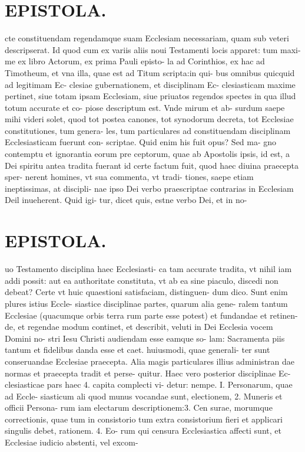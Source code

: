\documentclass{article}
\begin{document}
\begin{pages}
\section*{EPISTOLA. }\pstart cte constituendam regendamque suam Ecclesiam necessariam, quam sub veteri descripserat. Id quod cum ex variis aliis noui Testamenti locis apparet: tum maxi- me ex libro Actorum, ex prima Pauli episto- la ad Corinthios, ex hac ad Timotheum, et vna illa, quae est ad Titum scripta:in qui- bus omnibus quicquid ad legitimam Ec- clesiae gubernationem, et disciplinam Ec- clesiasticam maxime pertinet, siue totam ipsam Ecclesiam, siue priuatos regendos spectes in qua illud totum accurate et co- piose descriptum est. Vnde mirum et ab- surdum saepe mihi videri solet, quod tot postea canones, tot synodorum decreta, tot Ecclesiae constitutiones, tum genera- les, tum particulares ad constituendam disciplinam Ecclesiasticam fuerunt con- scriptae. Quid enim his fuit opus? Sed ma- gno contemptu et ignorantia eorum pre ceptorum, quae ab Apostolis ipsis, id est, a Dei spiritu antea tradita fuerant id certe factum fuit, quod haec diuina praecepta sper- nerent homines, vt sua commenta, vt tradi- tiones, saepe etiam ineptissimas, at discipli- nae ipso Dei verbo praescriptae contrarias in Ecclesiam Deil inueherent. Quid igi- tur, dicet quis, estne verbo Dei, et in no-  \pend
\section*{EPISTOLA. }\pstart uo Testamento disciplina haec Ecclesiasti- ca tam accurate tradita, vt nihil iam addi possit: aut ea authoritate constituta, vt ab ea sine piaculo, discedi non debeat? Certe vt huic quaestioni satisfaciam, distinguen- dum dico. Sunt enim plures istius Eccle- siastice disciplinae partes, quarum alia gene- ralem tantum Ecclesiae (quacumque orbis terra rum parte esse potest) et fundandae et retinen- de, et regendae modum continet, et describit, veluti in Dei Ecclesia vocem Domini no- stri Iesu Christi audiendam esse eamque so- lam: Sacramenta piis tantum et fidelibus danda esse et caet. huiusmodi, quae generali- ter sunt conseruandae Ecclesiae praecepta. Alia magis particulares illius administran dae normas et praecepta tradit et perse- quitur. Haec vero posterior disciplinae Ec- clesiasticae pars haec 4. capita complecti vi- detur: nempe. I. Personarum, quae ad Eccle- siasticum ali quod munus vocandae sunt, electionem, 2. Muneris et officii Persona- rum iam electarum descriptionem:3. Cen surae, morumque correctionis, quae tum in consistorio tum extra consistorium fieri et applicari singulis debet, rationem. 4. Eo- rum qui censura Ecclesiastica affecti sunt, et Ecclesiae iudicio abstenti, vel excom-  \pend

\end{pages}
\end{document}
